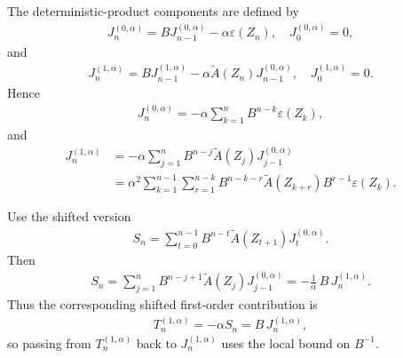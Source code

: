 The deterministic-product components are defined by
\begin{equation}
\begin{aligned}
J_n^{(0, \alpha)}
  = B J_{n-1}^{(0, \alpha)} - \alpha \varepsilon(Z_n),
\quad
J_0^{(0, \alpha)} = 0,
\end{aligned}
\end{equation}
and
\begin{equation}
\begin{aligned}
J_n^{(1, \alpha)}
  = B J_{n-1}^{(1, \alpha)}
    - \alpha \widetilde{A}(Z_n) J_{n-1}^{(0, \alpha)},
\quad
J_0^{(1, \alpha)} = 0.
\end{aligned}
\end{equation}
Hence
\begin{equation}
\begin{aligned}
J_n^{(0, \alpha)}
  = - \alpha \sum_{k=1}^n B^{n-k} \varepsilon(Z_k),
\end{aligned}
\end{equation}
and
\begin{equation}
\begin{aligned}
J_n^{(1, \alpha)}
&= - \alpha \sum_{j=1}^n
      B^{n-j} \widetilde{A}(Z_j) J_{j-1}^{(0, \alpha)} \\
&= \alpha^2 \sum_{k=1}^{n-1} \sum_{r=1}^{n-k}
      B^{n-k-r} \widetilde{A}(Z_{k+r}) B^{r-1} \varepsilon(Z_k).
\end{aligned}
\end{equation}

Use the shifted version
\begin{equation}
\begin{aligned}
S_n
  = \sum_{t=0}^{n-1}
      B^{n-t} \widetilde{A}(Z_{t+1}) J_t^{(0, \alpha)}.
\end{aligned}
\end{equation}
Then
\begin{equation}
\begin{aligned}
S_n
  = \sum_{j=1}^n B^{n-j+1} \widetilde{A}(Z_j) J_{j-1}^{(0, \alpha)}
  = - \frac{1}{\alpha} \, B \, J_n^{(1, \alpha)}.
\end{aligned}
\end{equation}
Thus the corresponding shifted first-order contribution is
\begin{equation}
\begin{aligned}
T_n^{(1, \alpha)} = - \alpha S_n = B \, J_n^{(1, \alpha)},
\end{aligned}
\end{equation}
so passing from \(T_n^{(1, \alpha)}\) back to \(J_n^{(1, \alpha)}\) uses the local
bound on \(B^{-1}\).

